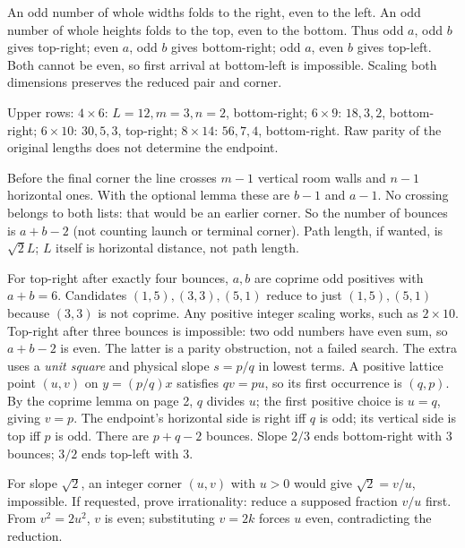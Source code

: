 \documentclass[11pt]{article}
\begin{document}
An odd number of whole widths folds to the right, even to the left. An odd number of whole heights folds to the top, even to the bottom. Thus odd $a$, odd $b$ gives top-right; even $a$, odd $b$ gives bottom-right; odd $a$, even $b$ gives top-left. Both cannot be even, so first arrival at bottom-left is impossible. Scaling both dimensions preserves the reduced pair and corner.

Upper rows: $4\times6$: $L=12,m=3,n=2$, bottom-right; $6\times9$: $18,3,2$, bottom-right; $6\times10$: $30,5,3$, top-right; $8\times14$: $56,7,4$, bottom-right. Raw parity of the original lengths does not determine the endpoint.

\newpage

Before the final corner the line crosses $m-1$ vertical room walls and $n-1$ horizontal ones. With the optional lemma these are $b-1$ and $a-1$. No crossing belongs to both lists: that would be an earlier corner. So the number of bounces is $a+b-2$ (not counting launch or terminal corner). Path length, if wanted, is $\sqrt2 L$; $L$ itself is horizontal distance, not path length.

For top-right after exactly four bounces, $a,b$ are coprime odd positives with $a+b=6$. Candidates $(1,5),(3,3),(5,1)$ reduce to just $(1,5),(5,1)$ because $(3,3)$ is not coprime. Any positive integer scaling works, such as $2\times10$. Top-right after three bounces is impossible: two odd numbers have even sum, so $a+b-2$ is even. The latter is a parity obstruction, not a failed search.
The extra uses a \emph{unit square} and physical slope $s=p/q$ in lowest terms. A positive lattice point $(u,v)$ on $y=(p/q)x$ satisfies $qv=pu$, so its first occurrence is $(q,p)$. By the coprime lemma on page 2, $q$ divides $u$; the first positive choice is $u=q$, giving $v=p$. The endpoint's horizontal side is right iff $q$ is odd; its vertical side is top iff $p$ is odd. There are $p+q-2$ bounces. Slope $2/3$ ends bottom-right with 3 bounces; $3/2$ ends top-left with 3.

For slope $\sqrt2$, an integer corner $(u,v)$ with $u>0$ would give $\sqrt2=v/u$, impossible. If requested, prove irrationality: reduce a supposed fraction $v/u$ first. From $v^2=2u^2$, $v$ is even; substituting $v=2k$ forces $u$ even, contradicting the reduction.
\end{document}
